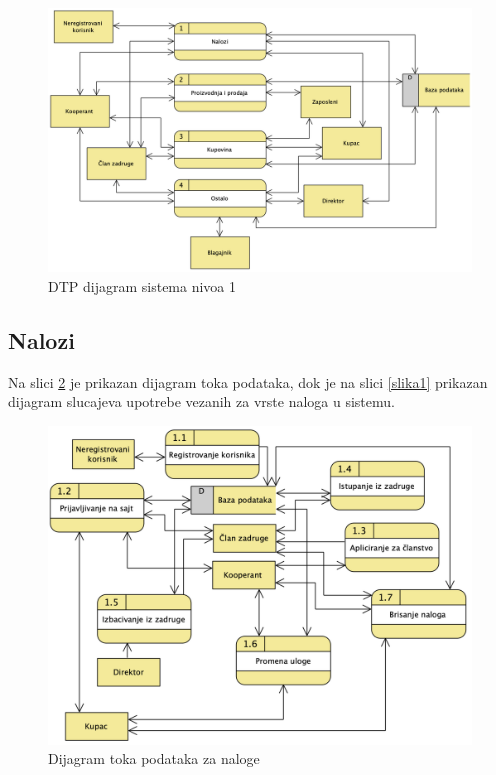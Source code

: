 \documentclass[a4paper]{article}
\begin{document}
\begin{figure}[h!]
    \centering
    \includegraphics[scale=0.5]{images/dtp_nivo_1.png}
    \caption{DTP dijagram sistema nivoa 1}
    \label{dtp_nivo_1}
\end{figure}

\subsection{Nalozi}
Na slici \ref{dtp_nalozi} je prikazan dijagram toka podataka, dok je na slici \ref{slika1} prikazan dijagram slucajeva upotrebe vezanih za vrste naloga u sistemu.
\begin{figure}[h!]
    \centering
    \includegraphics[scale=0.6]{images/dtp_nalozi.png}
    \caption{Dijagram toka podataka za naloge}
    \label{dtp_nalozi}
\end{figure}
\end{document}
